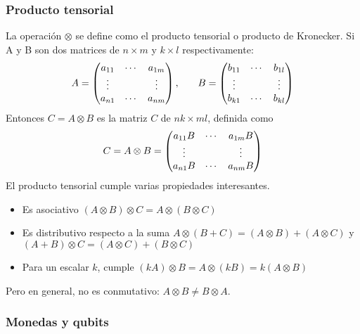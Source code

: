 \subsubsection{Producto tensorial}
\label{sss:producto-tensorial}

La operación $\otimes$ se define como el producto tensorial o producto de 
Kronecker. Si A y B son dos matrices de $n \times m$ y $k \times l$ 
respectivamente:
%
$$
\begin{array}{c c}
	A=\begin{pmatrix} 
		a_{11} & \cdots & a_{1m} \\
		\vdots &        & \vdots \\
		a_{n1} & \cdots & a_{nm}
	 \end{pmatrix}
	,\quad
	&
	B=\begin{pmatrix} 
		b_{11} & \cdots & b_{1l} \\
		\vdots &        & \vdots \\
		b_{k1} & \cdots & b_{kl}
	 \end{pmatrix}
\end{array}
$$
%
Entonces $C = A \otimes B$ es la matriz $C$ de $nk \times ml$, definida como
%
$$
C = A \otimes B=\begin{pmatrix} 
	a_{11} B & \cdots & a_{1m} B \\
	\vdots   &        & \vdots   \\
	a_{n1} B & \cdots & a_{nm} B
 \end{pmatrix}
$$
%
El producto tensorial cumple varias propiedades interesantes.
%
\begin{itemize}
\item Es asociativo $(A \otimes B) \otimes C = A \otimes (B \otimes C)$

\item Es distributivo respecto a la suma $A \otimes (B + C) = (A \otimes B) + (A
\otimes C) $ y $(A + B) \otimes C = (A \otimes C) + (B \otimes C)$

\item Para un escalar $k$, cumple $(kA) \otimes B = A \otimes (kB) = k (A 
\otimes B)$
\end{itemize}
%
Pero en general, no es conmutativo: $A \otimes B \neq B \otimes A$.

\subsubsection{Monedas y qubits}


